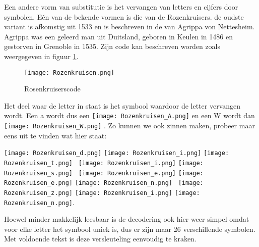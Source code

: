 Een andere vorm van substitutie is het vervangen van letters en cijfers door symbolen. E\'en van de bekende vormen is die van de Rozenkruisers. de oudste variant is afkomstig uit 1533 en is beschreven in de  van Agrippa von Nettesheim. Agrippa was een geleerd man uit Duitsland, geboren in Keulen in 1486 en gestorven in Grenoble in 1535. Zijn code kan beschreven worden zoals weergegeven in figuur \ref{fig:rosenkruisen}.

\begin{figure}[h!]
	\centering
	\texttt{[image: Rozenkruisen.png]}
	\caption{Rosenkruiserscode}
	\label{fig:rosenkruisen}
\end{figure}

Het deel waar de letter in staat is het symbool waardoor de letter vervangen wordt. Een a wordt dus een 
\texttt{[image: Rozenkruisen\_A.png]}
en een W wordt dan 
\texttt{[image: Rozenkruisen\_W.png]}
. Zo kunnen we ook zinnen maken, probeer maar eens uit te vinden wat hier staat:


\texttt{[image: Rozenkruisen\_d.png]} \texttt{[image: Rozenkruisen\_i.png]} \texttt{[image: Rozenkruisen\_t.png]} \, \texttt{[image: Rozenkruisen\_i.png]} \texttt{[image: Rozenkruisen\_s.png]} \, \texttt{[image: Rozenkruisen\_e.png]} \texttt{[image: Rozenkruisen\_e.png]} \texttt{[image: Rozenkruisen\_n.png]} \, \texttt{[image: Rozenkruisen\_z.png]} \texttt{[image: Rozenkruisen\_i.png]} \texttt{[image: Rozenkruisen\_n.png]}.

Hoewel minder makkelijk leesbaar is de decodering ook hier weer simpel omdat voor elke letter het symbool uniek is, dus er zijn maar 26 verschillende symbolen. Met voldoende tekst is deze versleuteling eenvoudig te kraken.

